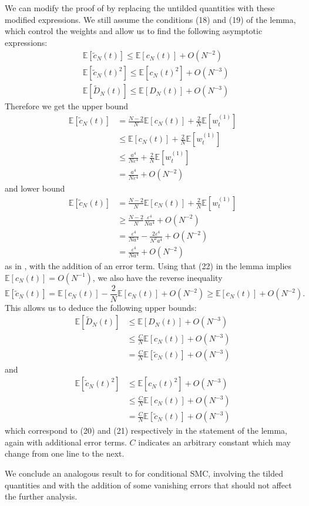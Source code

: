 \documentclass[fleqn]{article}
\newcommand{\E}{\mathbb{E}}
\newcommand{\wt}[2][t]{w_{#1}^{(#2)}}
\begin{document}
We can modify the proof of \citet[Lemma 3]{koskela2018} by replacing the untilded quantities with these modified expressions.
We still assume the conditions (18) and (19) of the lemma, which control the weights and allow us to find the following asymptotic expressions:
\begin{align*}
& \E[\tilde{c}_N(t)] \leq \E[c_N(t)] + O(N^{-2}) \\
& \E[\tilde{c}_N(t)^2] \leq \E[c_N(t)^2] + O(N^{-3}) \\
& \E[\tilde{D}_N(t)] \leq \E[D_N(t)] +O(N^{-3})
\end{align*}
Therefore we get the upper bound
\begin{align*}
\E[\tilde{c}_N(t)] &= \frac{N-2}{N} \E[c_N(t)] + \frac{2}{N} \E[\wt{1}] \\
& \leq \E[c_N(t)] + \frac{2}{N} \E[\wt{1}] \\
&\leq \frac{a^4}{N\varepsilon^4} +  \frac{2}{N} \E[\wt{1}] \\
&= \frac{a^4}{N\varepsilon^4} + O(N^{-2})
\end{align*}
and lower bound
\begin{align*}
\E[\tilde{c}_N(t)] &= \frac{N-2}{N} \E[c_N(t)] + \frac{2}{N} \E[\wt{1}] \\
& \geq  \frac{N-2}{N}\frac{\varepsilon^4}{Na^4} + O(N^{-2}) \\
& = \frac{\varepsilon^4}{Na^4} - \frac{2\varepsilon^4}{N^2a^4} + O(N^{-2}) \\
& = \frac{\varepsilon^4}{Na^4} + O(N^{-2})
\end{align*}
as in \citet{koskela2018}, with the addition of an error term.
Using that (22) in the lemma implies $\E[c_N(t)] = O(N^{-1})$, we also have the reverse inequality
\begin{equation*}
\E[\tilde{c}_N(t)] = \E[c_N(t)] - \frac{2}{N}\E[c_N(t)] + O(N^{-2}) \geq \E[c_N(t)] + O(N^{-2}).
\end{equation*}
This allows us to deduce the following upper bounds:
\begin{align*}
\E[\tilde{D}_N(t)] &\leq \E[D_N(t)] + O(N^{-3}) \\
&\leq \frac{C}{N} \E[c_N(t)] + O(N^{-3}) \\
&= \frac{C}{N} \E[\tilde{c}_N(t)] + O(N^{-3})
\end{align*}
and
\begin{align*}
\E[\tilde{c}_N(t)^2] &\leq \E[c_N(t)^2] + O(N^{-3}) \\
&\leq \frac{C}{N} \E[c_N(t)] + O(N^{-3}) \\
&= \frac{C}{N} \E[\tilde{c}_N(t)] + O(N^{-3})
\end{align*}
which correspond to (20) and (21) respectively in the statement of the lemma, again with additional error terms. $C$ indicates an arbitrary constant which may change from one line to the next.

We conclude an analogous result to \citet[Lemma 3]{koskela2018} for conditional SMC, involving the tilded quantities and with the addition of some vanishing errors that should not affect the further analysis.


\end{document}
